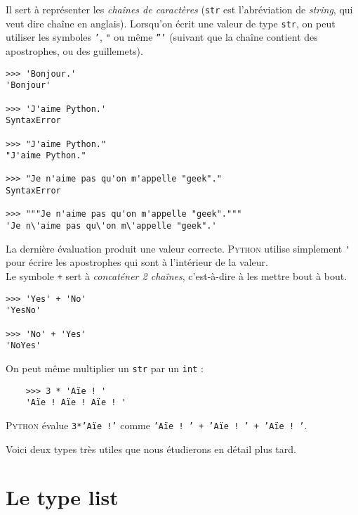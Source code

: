 Il sert à représenter les \textit{chaînes de caractères} (\texttt{str} est l'abréviation de \textit{string}, qui veut dire chaîne en anglais).
Lorsqu'on écrit une valeur de type \texttt{str}, on peut utiliser les symboles \texttt{'}, \texttt{"} ou même \texttt{'''} (suivant que la chaîne contient des apostrophes, ou des guillemets).

\begin{pyc}\begin{verbatim}
>>> 'Bonjour.'
'Bonjour'

>>> 'J'aime Python.'
SyntaxError

>>> "J'aime Python."
"J'aime Python."

>>> "Je n'aime pas qu'on m'appelle "geek"."
SyntaxError

>>> """Je n'aime pas qu'on m'appelle "geek"."""
'Je n\'aime pas qu\'on m\'appelle "geek".'
\end{verbatim}
\end{pyc}
La dernière évaluation produit une valeur correcte. \textsc{Python} utilise simplement \texttt{\'} pour écrire les apostrophes qui sont à l'intérieur de la valeur.\\


Le symbole \texttt{+} sert à \textit{concaténer 2 chaînes}, c'est-à-dire à les mettre bout à bout.

\begin{pyc}\begin{verbatim}
>>> 'Yes' + 'No'
'YesNo'

>>> 'No' + 'Yes'
'NoYes'
\end{verbatim}
\end{pyc}

On peut même multiplier un \texttt{str} par un \texttt{int} :
\begin{pyc}
  \begin{verbatim}
    >>> 3 * 'Aïe ! '
    'Aïe ! Aïe ! Aïe ! '
  \end{verbatim}
\end{pyc}
\textsc{Python} évalue \texttt{3*'Aïe !'} comme \texttt{'Aïe ! ' + 'Aïe ! ' + 'Aïe ! '}.


Voici deux types très utiles que nous étudierons en détail plus tard.

\section{Le type list}

